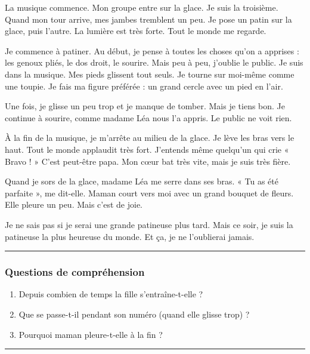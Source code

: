 \documentclass[
  french,
  14pt,
  a4paper,
]{extarticle}
\providecommand{\tightlist}{%
  \setlength{\itemsep}{0pt}\setlength{\parskip}{0pt}}
\begin{document}
La musique commence. Mon groupe entre sur la glace. Je suis la
troisième. Quand mon tour arrive, mes jambes tremblent un peu. Je pose
un patin sur la glace, puis l'autre. La lumière est très forte. Tout le
monde me regarde.

Je commence à patiner. Au début, je pense à toutes les choses qu'on a
apprises : les genoux pliés, le dos droit, le sourire. Mais peu à peu,
j'oublie le public. Je suis dans la musique. Mes pieds glissent tout
seuls. Je tourne sur moi-même comme une toupie. Je fais ma figure
préférée : un grand cercle avec un pied en l'air.

Une fois, je glisse un peu trop et je manque de tomber. Mais je tiens
bon. Je continue à sourire, comme madame Léa nous l'a appris. Le public
ne voit rien.

À la fin de la musique, je m'arrête au milieu de la glace. Je lève les
bras vers le haut. Tout le monde applaudit très fort. J'entends même
quelqu'un qui crie « Bravo ! » C'est peut-être papa. Mon cœur bat très
vite, mais je suis très fière.

Quand je sors de la glace, madame Léa me serre dans ses bras. « Tu as
été parfaite », me dit-elle. Maman court vers moi avec un grand bouquet
de fleurs. Elle pleure un peu. Mais c'est de joie.

Je ne sais pas si je serai une grande patineuse plus tard. Mais ce soir,
je suis la patineuse la plus heureuse du monde. Et ça, je ne l'oublierai
jamais.

\begin{center}\rule{0.5\linewidth}{0.5pt}\end{center}

\subsubsection{Questions de
compréhension}\label{questions-de-compruxe9hension-12}

\begin{enumerate}
\def\labelenumi{\arabic{enumi}.}
\tightlist
\item
  Depuis combien de temps la fille s'entraîne-t-elle ?
\item
  Que se passe-t-il pendant son numéro (quand elle glisse trop) ?
\item
  Pourquoi maman pleure-t-elle à la fin ?
\end{enumerate}

\begin{center}\rule{0.5\linewidth}{0.5pt}\end{center}
\end{document}
